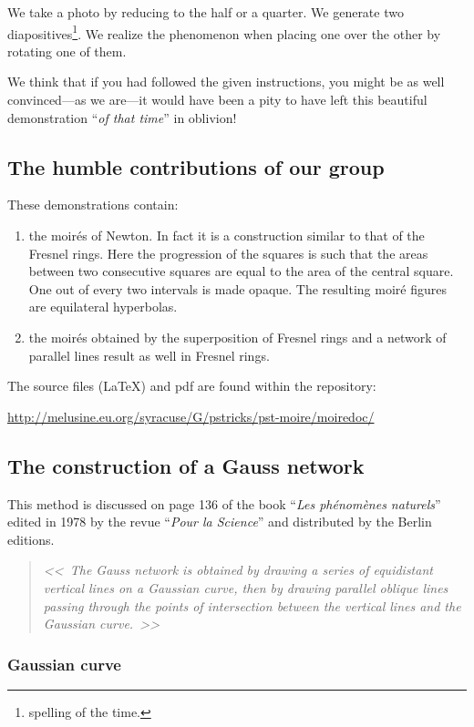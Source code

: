 \documentclass[%
    11pt,
    english,
    BCOR10mm,
    DIV12,
    bibliography=totoc,
    parskip=false,
    fleqn,
    smallheadings,
    headexclude,
    footexclude,
    oneside,
    dvipsnames,
    svgnames,
    x11names
]{pst-doc}
\begin{document}
{{{\indent We take a photo by reducing to the half or a quarter. We generate two diapositives\footnote{spelling of the time.}. We realize the phenomenon when placing one over the other by rotating one of them.

We think that if you had followed the given instructions, you might be as well convinced---as we are---it would have been a pity to have left this beautiful demonstration ``\textit{of that time}'' in oblivion!


\subsection{The humble contributions of our group}

These demonstrations contain:
\begin{enumerate}
\item the moirés of Newton. In fact it is a construction similar to that of the Fresnel rings. Here the progression of the squares is such that the areas between two consecutive squares are equal to the area of the central square. One out of every two intervals is made opaque. The resulting moiré figures are equilateral hyperbolas.
\item the moirés obtained by the superposition of Fresnel rings and a network of parallel lines result as well in Fresnel rings.
\end{enumerate}
The source files (\LaTeX) and pdf are found within the repository:
\begin{center}
\url{http://melusine.eu.org/syracuse/G/pstricks/pst-moire/moiredoc/}
\end{center}


\subsection{The construction of a Gauss network}

This method is discussed on page 136 of the book ``\textit{Les phénomènes naturels}'' edited in 1978 by the revue ``\textit{Pour la Science}'' and distributed by the Berlin editions.
\begin{quote}\itshape
<<~The Gauss network is obtained by drawing a series of equidistant vertical lines on a Gaussian curve, then by drawing parallel oblique lines passing through the points of intersection between the vertical lines and the Gaussian curve.~>>
\end{quote}


\subsubsection{Gaussian curve}

}}}
\end{document}
